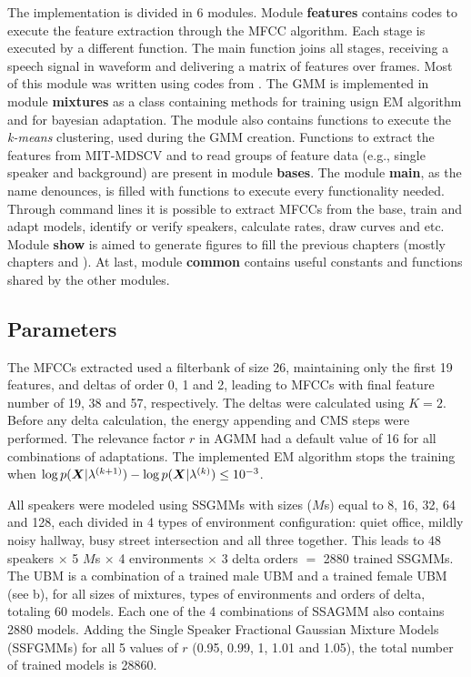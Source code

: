 The implementation is divided in 6 modules. Module \textbf{features} contains codes to execute the feature extraction through the MFCC algorithm. Each stage is executed by a different function. The main function joins all stages, receiving a speech signal in waveform and delivering a matrix of features over frames. Most of this module was written using codes from . The GMM is implemented in module \textbf{mixtures} as a class containing methods for training usign EM algorithm and for bayesian adaptation. The module also contains functions to execute the \emph{k-means} clustering, used during the GMM creation. Functions to extract the features from MIT-MDSCV and to read groups of feature data (e.g., single speaker and background) are present in module \textbf{bases}. The module \textbf{main}, as the name denounces, is filled with functions to execute every functionality needed. Through command lines it is possible to extract MFCCs from the base, train and adapt models, identify or verify speakers, calculate rates, draw curves and etc. Module \textbf{show} is aimed to generate figures to fill the previous chapters (mostly chapters  and ). At last, module \textbf{common} contains useful constants and functions shared by the other modules.

\subsection{Parameters}

The MFCCs extracted used a filterbank of size 26, maintaining only the first 19 features, and deltas of order 0, 1 and 2, leading to MFCCs with final feature number of 19, 38 and 57, respectively. The deltas were calculated using $K = 2$. Before any delta calculation, the energy appending and CMS steps were performed. The relevance factor $r$ in AGMM had a default value of 16 for all combinations of adaptations. The implemented EM algorithm stops the training when $\log p(\boldsymbol{X}|\lambda^{(k+1)}) - \log p(\boldsymbol{X}|\lambda^{(k)}) \le 10^{-3}$.

All speakers were modeled using SSGMMs with sizes ($M$s) equal to 8, 16, 32, 64 and 128, each divided in 4 types of environment configuration: quiet office, mildly noisy hallway, busy street intersection and all three together. This leads to 48 speakers $\times$ 5 $M$s $\times$ 4 environments $\times$ 3 delta orders $=$ 2880 trained SSGMMs. The UBM is a combination of a trained male UBM and a trained female UBM (see b), for all sizes of mixtures, types of environments and orders of delta, totaling 60 models. Each one of the 4 combinations of SSAGMM also contains 2880 models. Adding the Single Speaker Fractional Gaussian Mixture Models (SSFGMMs) for all 5 values of $r$ (0.95, 0.99, 1, 1.01 and 1.05), the total number of trained models is 28860.

